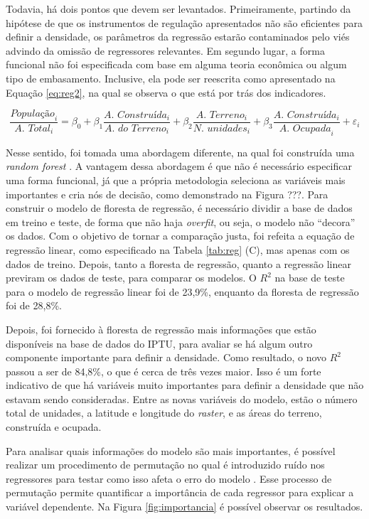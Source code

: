 Todavia, há dois pontos que devem ser levantados. Primeiramente, partindo da hipótese de que os instrumentos de regulação apresentados não são eficientes para definir a densidade, os parâmetros da regressão estarão contaminados pelo viés advindo da omissão de regressores relevantes. Em segundo lugar, a forma funcional não foi especificada com base em alguma teoria econômica ou algum tipo de embasamento. Inclusive, ela pode ser reescrita como apresentado na Equação \ref{eq:reg2}, na qual se observa o que está por trás dos indicadores.

\begin{equation}
    \frac{\textit{População}_i}{\textit{A. Total}_i}=\beta_0+\beta_1\frac{\textit{A. Construída}_i}{\textit{A. do Terreno}_i}+\beta_2\frac{\textit{A. Terreno}_i}{\textit{N. unidades}_i}+\beta_3\frac{\textit{A. Construída}_i}{\textit{A. Ocupada}_i}+\varepsilon_i
    \label{eq:reg2}
\end{equation}

Nesse sentido, foi tomada uma abordagem diferente, na qual foi construída uma \textit{random forest} \cite{wright2015ranger}. A vantagem dessa abordagem é que não é necessário especificar uma forma funcional, já que a própria metodologia seleciona as variáveis mais importantes e cria nós de decisão, como demonstrado na Figura ???. Para construir o modelo de floresta de regressão, é necessário dividir a base de dados em treino e teste, de forma que não haja \textit{overfit}, ou seja, o modelo não ``decora'' os dados. Com o objetivo de tornar a comparação justa, foi refeita a equação de regressão linear, como especificado na Tabela \ref{tab:reg} (C), mas apenas com os dados de treino. Depois, tanto a floresta de regressão, quanto a regressão linear previram os dados de teste, para comparar os modelos. O $R^2$ na base de teste para o modelo de regressão linear foi de 23,9\%, enquanto da floresta de regressão foi de 28,8\%.

Depois, foi fornecido à floresta de regressão mais informações que estão disponíveis na base de dados do IPTU, para avaliar se há algum outro componente importante para definir a densidade. Como resultado, o novo $R^2$ passou a ser de 84,8\%, o que é cerca de três vezes maior. Isso é um forte indicativo de que há variáveis muito importantes para definir a densidade que não estavam sendo consideradas. Entre as novas variáveis do modelo, estão o número total de unidades, a latitude e longitude do \textit{raster}, e as áreas do terreno, construída e ocupada.

Para analisar quais informações do modelo são mais importantes, é possível realizar um procedimento de permutação no qual é introduzido ruído nos regressores para testar como isso afeta o erro do modelo \cite{breiman2001random, Nembrini2018}. Esse processo de permutação permite quantificar a importância de cada regressor para explicar a variável dependente. Na Figura \ref{fig:importancia} é possível observar os resultados. 

